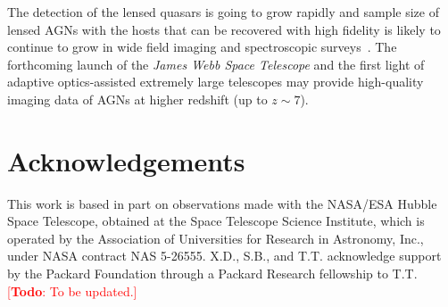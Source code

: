\documentclass[fleqn,usenatbib]{mnras}
\newcommand{\lenstronomy}{{\sc Lenstronomy}}
\newcommand{\todo}[1]{\textcolor{red}{[{\bf Todo}: #1]}}
\begin{document}
The detection of the lensed quasars is going to grow rapidly and sample size of lensed AGNs with the hosts that can be recovered with high fidelity is likely to continue to grow in wide field imaging and spectroscopic surveys~\citep[e.g.,][]{Oguri2010, Agn++15,Mor++16,Sch++16,Ost++17}. The forthcoming launch of the {\it James Webb Space Telescope} and the first light of adaptive optics-assisted extremely large telescopes may provide high-quality imaging data of AGNs at higher redshift (up to $z\sim7$).

\section*{Acknowledgements}

This work is based in part on observations made with the NASA/ESA Hubble Space Telescope, obtained at the Space Telescope Science Institute, which is operated by the Association of Universities for Research in Astronomy, Inc., under NASA contract NAS 5-26555. X.D., S.B., and T.T. acknowledge support by the Packard Foundation through a Packard Research fellowship to T.T. \todo{To be updated.}








\end{document}
